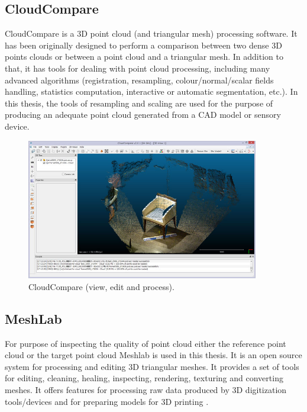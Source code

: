 \subsection{CloudCompare} \label{cloudcompareb}

CloudCompare is a 3D point cloud (and triangular mesh) processing software. It has been originally designed to perform a comparison between two dense 3D points clouds or between a point cloud and a triangular mesh. In addition to that, it has tools for dealing with point cloud processing, including many advanced algorithms (registration, resampling, colour/normal/scalar fields handling, statistics computation, interactive or automatic segmentation, etc.)\cite{cloudcompare}. In this thesis, the tools of resampling and scaling are used for the purpose of producing an adequate point cloud generated from a CAD model or sensory device.

\begin{figure}[!h]
\begin{center}
\includegraphics[width=4in]{figures02/cloudcompare.jpg}
\caption{CloudCompare (view, edit and process).}
\end{center}
\end{figure}


\subsection{MeshLab} \label{meshlabb}

For purpose of inspecting the quality of point cloud either the reference point cloud or the target point cloud Meshlab is used in this thesis. It is an open source system for processing and editing 3D triangular meshes. It provides a set of tools for editing, cleaning, healing, inspecting, rendering, texturing and converting meshes. It offers features for processing raw data produced by 3D digitization tools/devices and for preparing models for 3D printing \cite{meshlab}.

